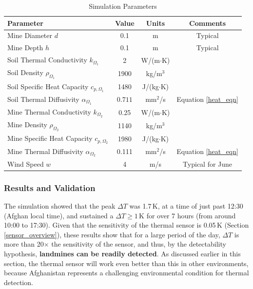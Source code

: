         \begin{table}[ht]
        \centering

        \label{tab:properties}
        \begin{tabular}{lccc}
        \hline
        \textbf{Parameter} & \textbf{Value} & \textbf{Units} & \textbf{Comments}\\
        \hline
        Mine Diameter \(d\)       & 0.1     & m    & Typical\\
        Mine Depth \(h\)          & 0.1   & m    & Typical\\
        Soil Thermal Conductivity $k_{\Omega_1}$ & 2  & W/(m$\cdot$K) & \cite{szymanik2011soil}\\
        Soil Density $\rho_{\Omega_1}$     & 1900     & kg/m$^3$ & \cite{szymanik2011soil}\\
        Soil Specific Heat Capacity $c_{p,{\Omega_1}}$  & 1480     & J/(kg$\cdot$K) & \cite{szymanik2011soil}\\
        Soil Thermal Diffusivity $\alpha_{\Omega_1}$ & $0.711$ & mm$^2$/s    & Equation \ref{heat_eqn}\\
        Mine Thermal Conductivity $k_{\Omega_2}$ & 0.25  & W/(m$\cdot$K) & \cite{szymanik2011soil}\\
        Mine Density $\rho_{\Omega_2}$      & 1140     & kg/m$^3$ & \cite{szymanik2011soil}\\
        Mine Specific Heat Capacity $c_{p,{\Omega_2}}$ & 1980     & J/(kg$\cdot$K) & \cite{szymanik2011soil}\\
        Mine Thermal Diffusivity $\alpha_{\Omega_2}$ & 0.111 & mm$^2$/s    & Equation \ref{heat_eqn}\\
        Wind Speed \(w\)          & 4      & m/s  & Typical for June \tablefootnote{\url{https://weather-and-climate.com/average-monthly-Wind-speed,Kabul,Afghanistan}}\\
        \hline
        \end{tabular}
        \caption{Simulation Parameters}
        \end{table}

   


    \subsubsection{Results and Validation} \label{Results and Validation}
    
         The simulation showed that the peak \(\Delta T\) was 1.7\,K, at a time of just past 12:30 (Afghan local time), and sustained a \(\Delta T \geq 1\)\,K for over 7 hours (from around 10:00 to 17:30). Given that the sensitivity of the thermal sensor is 0.05\,K (Section \ref{sensor_overview}), these results show that for a large period of the day, \(\Delta T\) is more than 20$\times$ the sensitivity of the sensor, and thus, by the detectability hypothesis, \textbf{landmines can be readily detected}. As discussed earlier in this section, the thermal sensor will work even better than this in other environments, because Afghanistan represents a challenging environmental condition for thermal detection.
    
